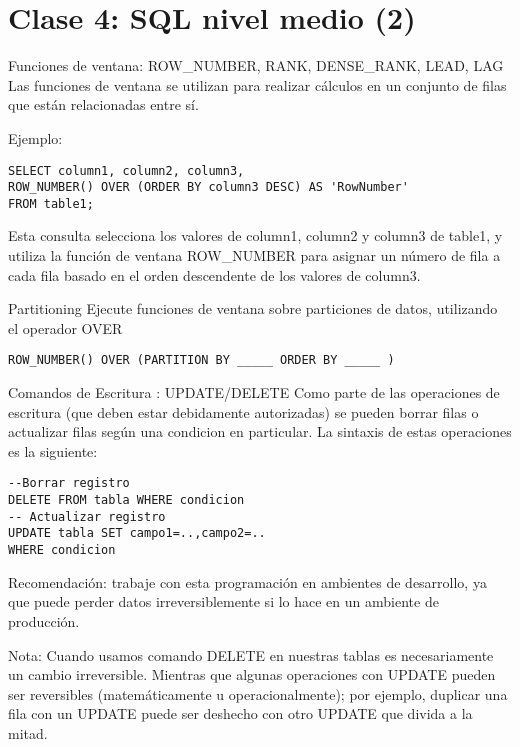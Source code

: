 \hypertarget{clase-4-sql-nivel-medio-2}{%
\section{Clase 4: SQL nivel medio (2)}\label{clase-4-sql-nivel-medio-2}}

\begin{frame}[fragile]{Funciones de ventana: ROW\_NUMBER, RANK,
DENSE\_RANK, LEAD, LAG}
\protect\hypertarget{funciones-de-ventana-row_number-rank-dense_rank-lead-lag}{}
Las funciones de ventana se utilizan para realizar cálculos en un
conjunto de filas que están relacionadas entre sí.

Ejemplo:

\begin{verbatim}
SELECT column1, column2, column3, 
ROW_NUMBER() OVER (ORDER BY column3 DESC) AS 'RowNumber' 
FROM table1;
\end{verbatim}

Esta consulta selecciona los valores de column1, column2 y column3 de
table1, y utiliza la función de ventana ROW\_NUMBER para asignar un
número de fila a cada fila basado en el orden descendente de los valores
de column3.
\end{frame}

\begin{frame}[fragile]{Partitioning}
\protect\hypertarget{partitioning}{}
Ejecute funciones de ventana sobre particiones de datos, utilizando el
operador OVER

\begin{verbatim}
ROW_NUMBER() OVER (PARTITION BY _____ ORDER BY _____ )
\end{verbatim}
\end{frame}

\begin{frame}[fragile]{Comandos de Escritura : UPDATE/DELETE}
\protect\hypertarget{comandos-de-escritura-updatedelete}{}
Como parte de las operaciones de escritura (que deben estar debidamente
autorizadas) se pueden borrar filas o actualizar filas según una
condicion en particular. La sintaxis de estas operaciones es la
siguiente:

\begin{verbatim}
--Borrar registro
DELETE FROM tabla WHERE condicion
-- Actualizar registro
UPDATE tabla SET campo1=..,campo2=..
WHERE condicion
\end{verbatim}

Recomendación: trabaje con esta programación en ambientes de desarrollo,
ya que puede perder datos irreversiblemente si lo hace en un ambiente de
producción.

Nota: Cuando usamos comando DELETE en nuestras tablas es necesariamente
un cambio irreversible. Mientras que algunas operaciones con UPDATE
pueden ser reversibles (matemáticamente u operacionalmente); por
ejemplo, duplicar una fila con un UPDATE puede ser deshecho con otro
UPDATE que divida a la mitad.
\end{frame}

